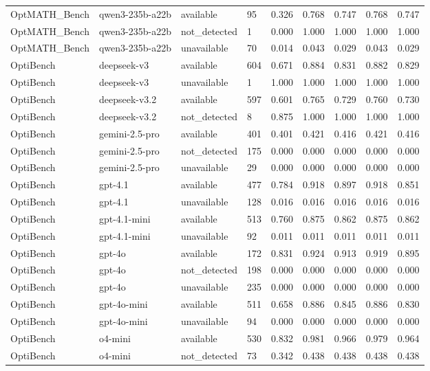 \begin{table}[t]
\begin{tabular}{lllllllll}
OptMATH\_Bench & qwen3-235b-a22b & available & 95 & 0.326 & 0.768 & 0.747 & 0.768 & 0.747 \\
OptMATH\_Bench & qwen3-235b-a22b & not\_detected & 1 & 0.000 & 1.000 & 1.000 & 1.000 & 1.000 \\
OptMATH\_Bench & qwen3-235b-a22b & unavailable & 70 & 0.014 & 0.043 & 0.029 & 0.043 & 0.029 \\
OptiBench & deepseek-v3 & available & 604 & 0.671 & 0.884 & 0.831 & 0.882 & 0.829 \\
OptiBench & deepseek-v3 & unavailable & 1 & 1.000 & 1.000 & 1.000 & 1.000 & 1.000 \\
OptiBench & deepseek-v3.2 & available & 597 & 0.601 & 0.765 & 0.729 & 0.760 & 0.730 \\
OptiBench & deepseek-v3.2 & not\_detected & 8 & 0.875 & 1.000 & 1.000 & 1.000 & 1.000 \\
OptiBench & gemini-2.5-pro & available & 401 & 0.401 & 0.421 & 0.416 & 0.421 & 0.416 \\
OptiBench & gemini-2.5-pro & not\_detected & 175 & 0.000 & 0.000 & 0.000 & 0.000 & 0.000 \\
OptiBench & gemini-2.5-pro & unavailable & 29 & 0.000 & 0.000 & 0.000 & 0.000 & 0.000 \\
OptiBench & gpt-4.1 & available & 477 & 0.784 & 0.918 & 0.897 & 0.918 & 0.851 \\
OptiBench & gpt-4.1 & unavailable & 128 & 0.016 & 0.016 & 0.016 & 0.016 & 0.016 \\
OptiBench & gpt-4.1-mini & available & 513 & 0.760 & 0.875 & 0.862 & 0.875 & 0.862 \\
OptiBench & gpt-4.1-mini & unavailable & 92 & 0.011 & 0.011 & 0.011 & 0.011 & 0.011 \\
OptiBench & gpt-4o & available & 172 & 0.831 & 0.924 & 0.913 & 0.919 & 0.895 \\
OptiBench & gpt-4o & not\_detected & 198 & 0.000 & 0.000 & 0.000 & 0.000 & 0.000 \\
OptiBench & gpt-4o & unavailable & 235 & 0.000 & 0.000 & 0.000 & 0.000 & 0.000 \\
OptiBench & gpt-4o-mini & available & 511 & 0.658 & 0.886 & 0.845 & 0.886 & 0.830 \\
OptiBench & gpt-4o-mini & unavailable & 94 & 0.000 & 0.000 & 0.000 & 0.000 & 0.000 \\
OptiBench & o4-mini & available & 530 & 0.832 & 0.981 & 0.966 & 0.979 & 0.964 \\
OptiBench & o4-mini & not\_detected & 73 & 0.342 & 0.438 & 0.438 & 0.438 & 0.438 \\

\end{tabular}
\end{table}
